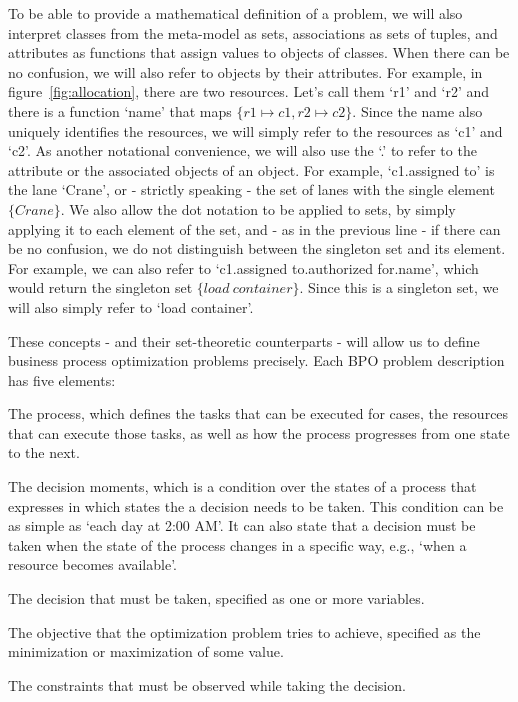 \documentclass[runningheads]{llncs}
\begin{document}
To be able to provide a mathematical definition of a problem, we will also interpret classes from the meta-model as sets, associations as sets of tuples, and attributes as functions that assign values to objects of classes. When there can be no confusion, we will also refer to objects by their attributes. For example, in figure~\ref{fig:allocation}, there are two resources. Let's call them `r1' and `r2' and there is a function `name' that maps $\{r1\mapsto c1, r2 \mapsto c2\}$. Since the name also uniquely identifies the resources, we will simply refer to the resources as `c1' and `c2'. As another notational convenience, we will also use the `.' to refer to the attribute or the associated objects of an object. For example, `c1.assigned to' is the lane `Crane', or - strictly speaking - the set of lanes with the single element $\{Crane\}$. We also allow the dot notation to be applied to sets, by simply applying it to each element of the set, and - as in the previous line - if there can be no confusion, we do not distinguish between the singleton set and its element. For example, we can also refer to `c1.assigned to.authorized for.name', which would return the singleton set $\{load\ container\}$. Since this is a singleton set, we will also simply refer to `load container'.

These concepts - and their set-theoretic counterparts - will allow us to define business process optimization problems precisely. Each BPO problem description has five elements:
\begin{compactitem}
    \item The process, which defines the tasks that can be executed for cases, the resources that can execute those tasks, as well as how the process progresses from one state to the next.
    \item The decision moments, which is a condition over the states of a process that expresses in which states the a decision needs to be taken. This condition can be as simple as `each day at 2:00 AM'. It can also state that a decision must be taken when the state of the process changes in a specific way, e.g., `when a resource becomes available'.
    \item The decision that must be taken, specified as one or more variables.
    \item The objective that the optimization problem tries to achieve, specified as the minimization or maximization of some value.
    \item The constraints that must be observed while taking the decision.
\end{compactitem}
\end{document}
